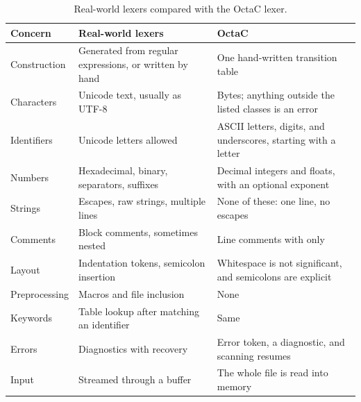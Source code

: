 \begin{table}[tbp]
\centering
\small
\renewcommand{\arraystretch}{1.15}
\begin{tabular}{@{}>{\raggedright\arraybackslash}p{62pt}>{\raggedright\arraybackslash}p{190pt}>{\raggedright\arraybackslash}p{180pt}@{}}
\toprule
\textbf{Concern} & \textbf{Real-world lexers} & \textbf{OctaC} \\
\midrule
Construction & Generated from regular expressions, or written by hand \cite{flex-manual,clang-internals} & One hand-written transition table \\
Characters & Unicode text, usually as UTF-8 & Bytes; anything outside the listed classes is an error \\
Identifiers & Unicode letters allowed \cite{unicode-uax31} & ASCII letters, digits, and underscores, starting with a letter \\
Numbers & Hexadecimal, binary, separators, suffixes \cite{rust-reference} & Decimal integers and floats, with an optional exponent \\
Strings & Escapes, raw strings, multiple lines \cite{rust-reference} & None of these: one line, no escapes \\
Comments & Block comments, sometimes nested \cite{rust-reference} & Line comments with \code{//} only \\
Layout & Indentation tokens, semicolon insertion \cite{python-reference,go-spec} & Whitespace is not significant, and semicolons are explicit \\
Preprocessing & Macros and file inclusion \cite{gcc-cppinternals} & None \\
Keywords & Table lookup after matching an identifier \cite{flex-manual} & Same \\
Errors & Diagnostics with recovery & Error token, a diagnostic, and scanning resumes \\
Input & Streamed through a buffer & The whole file is read into memory \\
\bottomrule
\end{tabular}
\caption{Real-world lexers compared with the OctaC lexer.}
\label{tab:lexer-simplifications}
\end{table}
